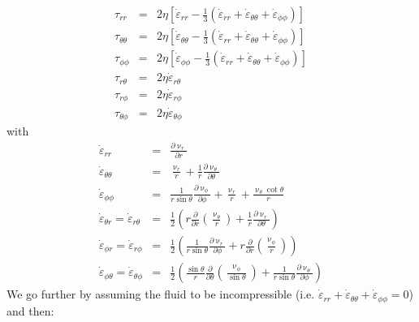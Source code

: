 \begin{eqnarray}
\tau_{rr} 
&=& 2 \eta 
\left[ \dot{\varepsilon}_{rr} - 
\frac{1}{3} (\dot{\varepsilon}_{rr} + \dot{\varepsilon}_{\theta\theta} + \dot{\varepsilon}_{\phi\phi} ) \right] \nonumber\\
\tau_{\theta\theta} &=& 2 \eta 
\left[ \dot{\varepsilon}_{\theta\theta} - 
\frac{1}{3} (\dot{\varepsilon}_{rr} + \dot{\varepsilon}_{\theta\theta} + \dot{\varepsilon}_{\phi\phi} ) \right] \nonumber\\
\tau_{\phi\phi} &=& 2 \eta 
\left[ \dot{\varepsilon}_{\phi\phi} - 
\frac{1}{3} (\dot{\varepsilon}_{rr} + \dot{\varepsilon}_{\theta\theta} + \dot{\varepsilon}_{\phi\phi} ) \right] \nonumber\\
\tau_{r\theta} &=&  2 \eta  \dot{\varepsilon}_{r\theta}\\
\tau_{r\phi} &=& 2 \eta  \dot{\varepsilon}_{r\phi} \\
\tau_{\theta\phi} &=&  2 \eta  \dot{\varepsilon}_{\theta\phi}
\end{eqnarray}
with
\begin{eqnarray}
\dot\varepsilon_{rr} 
&=& \frac{\partial \upnu_r}{\partial r} \nonumber\\
\dot\varepsilon_{\theta\theta} 
&=& \frac{\upnu_r}{r} + \frac{1}{r} \frac{\partial \upnu_\theta}{\partial \theta}  \nonumber\\
\dot\varepsilon_{\phi\phi} 
&=& \frac{1}{r \sin\theta} \frac{\partial \upnu_\phi}{\partial \phi} +
\frac{\upnu_r}{r} +\frac{\upnu_\theta \cot \theta}{r} \nonumber\\
\dot\varepsilon_{\theta r} = \dot\varepsilon_{r\theta}   
&=& \frac{1}{2} \left( r \frac{\partial}{\partial r} (\frac{\upnu_\theta}{r} ) 
+\frac{1}{r} \frac{\partial \upnu_r}{\partial \theta} \right) \nonumber\\
\dot\varepsilon_{\phi r} = \dot\varepsilon_{r\phi}      
&=&  \frac{1}{2} \left(  \frac{1}{r \sin\theta} \frac{\partial \upnu_r}{\partial \phi} 
+ r \frac{\partial }{\partial r} (\frac{\upnu_\phi}{r}) \right)  \nonumber\\
\dot\varepsilon_{\phi \theta} = \dot\varepsilon_{\theta\phi} 
&=& \frac{1}{2} \left( \frac{\sin \theta}{r} \frac{\partial }{\partial \theta} (\frac{\upnu_\phi}{\sin\theta}) + \frac{1}{r \sin\theta} \frac{\partial \upnu_\theta}{\partial \phi}    \right) \nonumber
\end{eqnarray}
We go further by assuming the fluid to be incompressible
(i.e. $\dot{\varepsilon}_{rr} + \dot{\varepsilon}_{\theta\theta} + \dot{\varepsilon}_{\phi\phi} =0$) and then:
